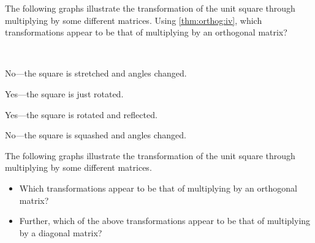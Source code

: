 \begin{example} \label{eg:}
The following graphs illustrate the transformation of the unit square through multiplying by some different matrices. 
Using \autoref{thm:orthog:iv}, which transformations appear to be that of multiplying by an orthogonal matrix?
\begin{parts}
\item {}
\item {}
\item {}
\item {}
\end{parts}

\begin{solution} \ 
\begin{parts}
\item No---the square is stretched and angles changed.
\item Yes---the square is just rotated.
\item Yes---the square is rotated and reflected.
\item No---the square is squashed and angles changed.
\end{parts}
\end{solution}
\end{example}




\begin{activity}
The following graphs illustrate the transformation of the unit square through multiplying by some different matrices. 
\begin{itemize}
\item Which transformations appear to be that of multiplying by an orthogonal matrix?
\actposs{\TwoD{-0.85}{-0.52}{-0.52}{0.85}}
{}
{}
{}
\item Further, which of the above transformations appear to be that of multiplying by a diagonal matrix?
\end{itemize}
\end{activity}





